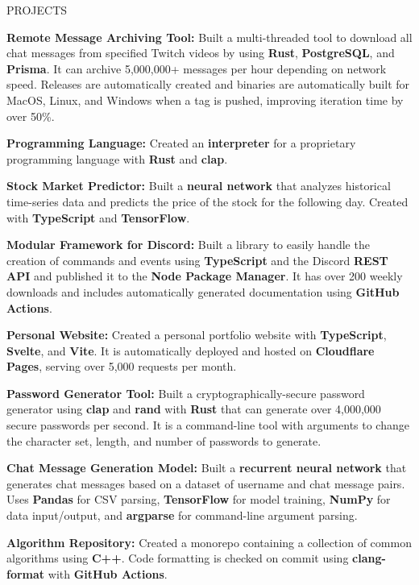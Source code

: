 \documentclass{resume}
\begin{document}
\begin{rSection}{PROJECTS}
	\vspace{-1.25em}

	\item \textbf{Remote Message Archiving Tool:} {Built a multi-threaded tool to download all chat messages from specified Twitch videos by using \textbf{Rust}, \textbf{PostgreSQL}, and \textbf{Prisma}. It can archive 5,000,000+ messages per hour depending on network speed. Releases are automatically created and binaries are automatically built for MacOS, Linux, and Windows when a tag is pushed, improving iteration time by over 50\%.}

	\item \textbf{Programming Language:} {Created an \textbf{interpreter} for a proprietary programming language with \textbf{Rust} and \textbf{clap}.}

	\item \textbf{Stock Market Predictor:} {Built a \textbf{neural network} that analyzes historical time-series data and predicts the price of the stock for the following day. Created with \textbf{TypeScript} and \textbf{TensorFlow}.}

	\item \textbf{Modular Framework for Discord:} {Built a library to easily handle the creation of commands and events using \textbf{TypeScript} and the Discord \textbf{REST API} and published it to the \textbf{Node Package Manager}. It has over 200 weekly downloads and includes automatically generated documentation using \textbf{GitHub Actions}.}

	\item \textbf{Personal Website:} {Created a personal portfolio website with \textbf{TypeScript}, \textbf{Svelte}, and \textbf{Vite}. It is automatically deployed and hosted on \textbf{Cloudflare Pages}, serving over 5,000 requests per month.}

	\item \textbf{Password Generator Tool:} {Built a cryptographically-secure password generator using \textbf{clap} and \textbf{rand} with \textbf{Rust} that can generate over 4,000,000 secure passwords per second. It is a command-line tool with arguments to change the character set, length, and number of passwords to generate.}

	\item \textbf{Chat Message Generation Model:} {Built a \textbf{recurrent neural network} that generates chat messages based on a dataset of username and chat message pairs. Uses \textbf{Pandas} for CSV parsing, \textbf{TensorFlow} for model training, \textbf{NumPy} for data input/output, and \textbf{argparse} for command-line argument parsing.}

	\item \textbf{Algorithm Repository:} {Created a monorepo containing a collection of common algorithms using \textbf{C++}. Code formatting is checked on commit using \textbf{clang-format} with \textbf{GitHub Actions}.}

\end{rSection}
\end{document}

